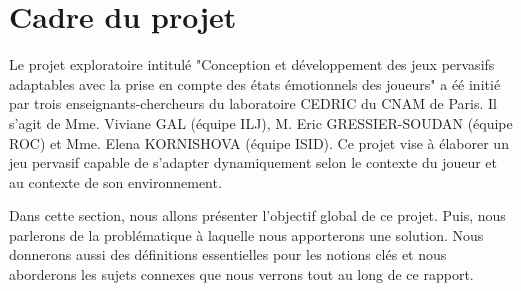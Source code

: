 \documentclass{article}
\begin{document}
\section{Cadre du projet}\label{sec:projet}
	Le projet exploratoire intitulé "Conception et développement des jeux pervasifs adaptables avec la prise en compte des états émotionnels des joueurs" a éé initié par trois enseignants-chercheurs du laboratoire CEDRIC du CNAM de Paris.
	Il s'agit de Mme. Viviane GAL (équipe ILJ), M. Eric GRESSIER-SOUDAN (équipe ROC) et Mme. Elena KORNISHOVA (équipe ISID).
	Ce projet vise à élaborer un jeu pervasif capable de s'adapter dynamiquement selon le contexte du joueur et au contexte de son environnement.\par
	Dans cette section, nous allons présenter l'objectif global de ce projet.
	Puis, nous parlerons de la problématique à laquelle nous apporterons une solution.
	Nous donnerons aussi des définitions essentielles pour les notions clés et nous aborderons les sujets connexes que nous verrons tout au long de ce rapport.
\end{document}
